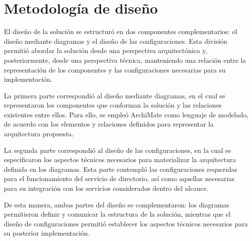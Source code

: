 \section{Metodología de diseño}\label{sec:metodologia-diseno}

El diseño de la solución se estructuró en dos componentes complementarios: el diseño mediante diagramas y el diseño de las configuraciones. Esta división permitió abordar la solución desde una perspectiva arquitectónica y, posteriormente, desde una perspectiva técnica, manteniendo una relación entre la representación de los componentes y las configuraciones necesarias para su implementación.

La primera parte correspondió al diseño mediante diagramas, en el cual se representaron los componentes que conforman la solución y las relaciones existentes entre ellos. Para ello, se empleó ArchiMate como lenguaje de modelado, de acuerdo con los elementos y relaciones definidos para representar la arquitectura propuesta.

La segunda parte correspondió al diseño de las configuraciones, en la cual se especificaron los aspectos técnicos necesarios para materializar la arquitectura definida en los diagramas. Esta parte contempló las configuraciones requeridas para el funcionamiento del servicio de directorio, así como aquellas necesarias para su integración con los servicios considerados dentro del alcance.

De esta manera, ambas partes del diseño se complementaron: los diagramas permitieron definir y comunicar la estructura de la solución, mientras que el diseño de configuraciones permitió establecer los aspectos técnicos necesarios para su posterior implementación.
